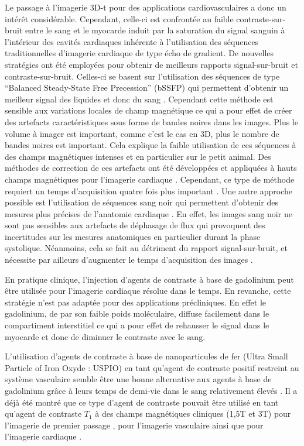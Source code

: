 Le passage à l'imagerie 3D-t pour des applications cardiovasculaires a donc un intérêt considérable. Cependant, celle-ci est confrontée au faible contraste-sur-bruit entre le sang et le myocarde induit par la saturation du signal sanguin à l'intérieur des cavités cardiaques inhérente à l'utilisation des séquences traditionnelles d'imagerie cardiaque de type écho de gradient. 
De nouvelles stratégies ont été employées pour obtenir de meilleurs rapports signal-sur-bruit et contraste-sur-bruit. Celles-ci se basent sur l’utilisation des séquences de type “Balanced Steady-State Free Precession” (bSSFP) qui permettent d’obtenir un meilleur signal des liquides et donc du sang \cite{Nezafat2008Inflow-quantifi}. Cependant cette méthode est sensible aux variations locales de champ magnétique ce qui a pour effet de créer des artefacts caractéristiques sous forme de bandes noires dans les images. Plus le volume à imager est important, comme c’est le cas en 3D, plus le nombre de bandes noires est important. Cela explique la faible utilisation de ces séquences à des champs magnétiques intenses et en particulier sur le petit animal. Des méthodes de correction de ces artefacts ont été développées \cite{Bangerter:2004kq} et appliquées à hauts champs magnétiques pour l’imagerie cardiaque \cite{Miraux:2008sf}.  Cependant, ce type de méthode requiert un temps d’acquisition quatre fois plus important \cite{Miraux:2008sf}. 
Une autre approche possible est l'utilisation de séquences sang noir qui permettent d'obtenir des mesures plus précises de l'anatomie cardiaque \cite{Berr2005Black-blood-gra}. En effet, les images sang noir ne sont pas sensibles aux artefacts de déphasage de flux qui provoquent des incertitudes sur les mesures anatomiques en particulier durant la phase systolique. Néanmoins, cela se fait au détriment du rapport signal-sur-bruit, et nécessite par ailleurs d’augmenter le temps d’acquisition des images  \cite{Miraux:2009rm}.

En pratique clinique, l’injection d’agents de contraste à base de gadolinium peut être utilisée pour l’imagerie cardiaque résolue dans le temps. En revanche, cette stratégie n’est pas adaptée pour des applications précliniques. En effet le gadolinium, de par son faible poids moléculaire, diffuse facilement dans le compartiment interstitiel ce qui a pour effet de rehausser le signal dans le myocarde et donc de diminuer le contraste avec le sang.

L’utilisation d’agents de contraste à base de nanoparticules de fer (Ultra Small Particle of Iron Oxyde : USPIO) en tant qu’agent de contraste positif restreint au système vasculaire semble être une bonne alternative aux agents à base de gadolinium grâce à leurs temps de demi-vie dans le sang relativement élevés  \cite{Corot:2006fk,Neuwelt:2009aa}. Il a déjà été montré que ce type d’agent de contraste pouvait être utilisé en tant qu’agent de contraste $T_1$ à des champs magnétiques cliniques (1,5T et 3T) pour l’imagerie de premier passage \cite{Li:2005uq}, pour l'imagerie vasculaire \cite{Sigovan:2009aa,Nayak:2014aa} ainsi que pour l'imagerie cardiaque \cite{Amano:2000aa}.


